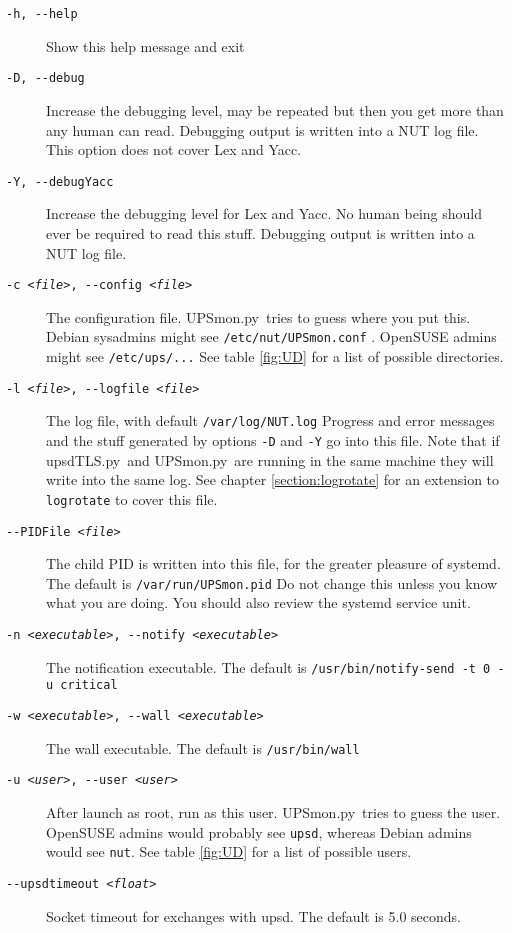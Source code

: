 \documentclass[12pt]{article}
\newcommand{\upsd}{\mbox{\textcolor{UPSDCOLOUR}{upsd}}}
\newcommand{\upsdTLS}{\mbox{\textcolor{UPSDCOLOUR}{upsdTLS.py}}}
\newcommand{\UPSmon}{\mbox{\textcolor{UPSMONCOLOUR}{UPSmon.py}}}
\begin{document}
\begin{description}

\item[\texttt{-h, -\/-help}]  Show this help message and exit
\item[\texttt{-D, -\/-debug}] Increase the debugging level, may be repeated
  but then you get more than any human can read.  Debugging output is written
  into a NUT log file.  This option does not cover Lex and Yacc.
\item[\texttt{-Y, -\/-debugYacc}] Increase the debugging level for Lex and
  Yacc.  No human being should ever be required to read this stuff.  Debugging
  output is written into a NUT log file.
\item[\texttt{-c \textit{<file>}, -\/-config \textit{<file>}}] The
  configuration file.  \UPSmon\ tries to guess where you put this.  Debian
  sysadmins might see \texttt{/etc/nut/UPSmon.conf} . OpenSUSE admins might
  see \texttt{/etc/ups/...}  See table \ref{fig:UD} for a list of possible
  directories.
\item[\texttt{-l \textit{<file>}, -\/-logfile \textit{<file>}}] The log file,
  with default \texttt{/var/log/NUT.log} Progress and error messages and the
  stuff generated by options \texttt{-D} and \texttt{-Y} go into this file.
  Note that if \upsdTLS\ and \UPSmon\ are running in the same machine they
  will write into the same log.  See chapter \ref{section:logrotate} for an
  extension to \texttt{logrotate} to cover this file.
\item[\texttt{-\/-PIDFile \textit{<file>}}] The child PID is written into this
  file, for the greater pleasure of systemd.  The default is
  \texttt{/var/run/UPSmon.pid} Do not change this unless you know what you
  are doing.  You should also review the systemd service unit.
\item[\texttt{-n \textit{<executable>}, -\/-notify \textit{<executable>}}] The
  notification executable. The default is
  \texttt{/usr/{\allowbreak}bin/{\allowbreak}notify-send -t 0 -u critical}
\item[\texttt{-w \textit{<executable>}, -\/-wall \textit{<executable>}}] The
  wall executable. The default is \texttt{/usr/bin/wall}
\item[\texttt{-u \textit{<user>}, -\/-user \textit{<user>}}] After launch as
  root, run as this user.  \UPSmon\ tries to guess the user. OpenSUSE admins
  would probably see \texttt{upsd}, whereas Debian admins would see
  \texttt{nut}. See table \ref{fig:UD} for a list of possible users.
\item[\texttt{-\/-upsdtimeout \textit{<float>}}] Socket timeout for exchanges
  with \upsd. The default is 5.0 seconds.


\end{description}
\end{document}
